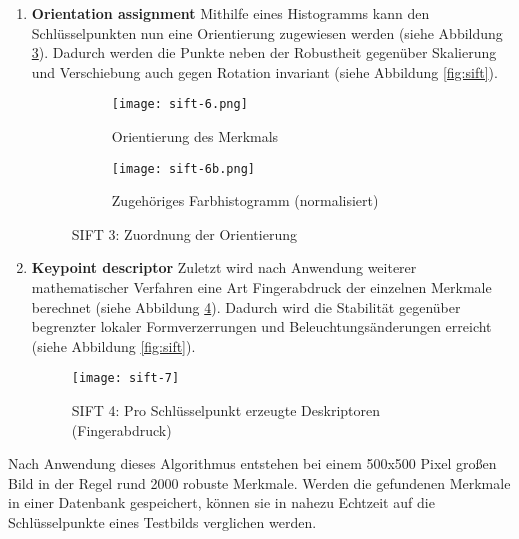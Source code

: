 \begin{enumerate}
    \item \textbf{Orientation assignment}\newline
    Mithilfe eines Histogramms kann den Schlüsselpunkten nun eine Orientierung
    zugewiesen werden (siehe Abbildung \ref{fig:sift-orientation}). Dadurch
    werden die Punkte neben der Robustheit gegenüber Skalierung und Verschiebung
    auch gegen Rotation invariant (siehe Abbildung \ref{fig:sift}).
    \parencite{sift-web-orientation}

    \begin{figure}[H]
        \centering
        \begin{subfigure}{.5\textwidth}
          \centering
          \texttt{[image: sift-6.png]}
          \caption{Orientierung des Merkmals}
          \label{fig:sift6}
        \end{subfigure}%
        \begin{subfigure}{.5\textwidth}
          \centering
          \texttt{[image: sift-6b.png]}
          \caption{Zugehöriges Farbhistogramm (normalisiert)}
          \label{fig:sift6b}
        \end{subfigure}
        \caption{SIFT 3: Zuordnung der Orientierung}
        \label{fig:sift-orientation}
    \end{figure}

    \item \textbf{Keypoint descriptor}\newline
    Zuletzt wird nach Anwendung weiterer mathematischer Verfahren eine Art
    Fingerabdruck der einzelnen Merkmale berechnet (siehe Abbildung
    \ref{fig:sift7}). Dadurch wird die Stabilität gegenüber begrenzter lokaler
    Formverzerrungen und Beleuchtungsänderungen erreicht (siehe Abbildung
    \ref{fig:sift}). \parencite{sift-web-descriptor}

    \begin{figure}[H]
        \centering
        \texttt{[image: sift-7]}
        \caption{SIFT 4: Pro Schlüsselpunkt erzeugte Deskriptoren (Fingerabdruck)}
        \label{fig:sift7}
    \end{figure}
\end{enumerate}

Nach Anwendung dieses Algorithmus entstehen bei einem 500x500 Pixel großen Bild
in der Regel rund 2000 robuste Merkmale. Werden die gefundenen Merkmale in einer 
Datenbank gespeichert, können sie in nahezu Echtzeit auf die Schlüsselpunkte
eines Testbilds verglichen werden. \parencite{sift-distinctive-features}

